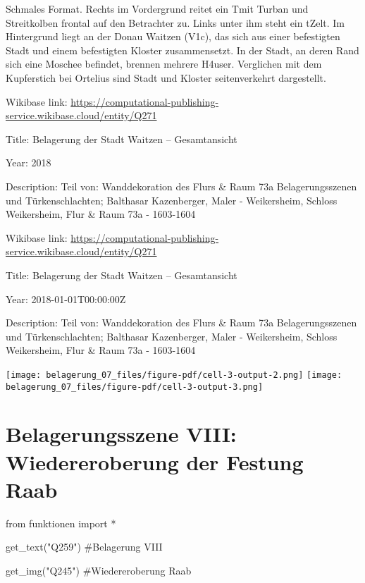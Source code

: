 \documentclass[
  a4paper,
  portrait]{book}
\newenvironment{Shaded}{\begin{snugshade}}{\end{snugshade}}
\newcommand{\CommentTok}[1]{\textcolor[rgb]{0.37,0.37,0.37}{#1}}
\newcommand{\ImportTok}[1]{\textcolor[rgb]{0.00,0.46,0.62}{#1}}
\newcommand{\NormalTok}[1]{\textcolor[rgb]{0.00,0.23,0.31}{#1}}
\newcommand{\OperatorTok}[1]{\textcolor[rgb]{0.37,0.37,0.37}{#1}}
\newcommand{\StringTok}[1]{\textcolor[rgb]{0.13,0.47,0.30}{#1}}
\begin{document}
Schmales Format. Rechts im Vordergrund reitet ein T\xbcrke mit
Turban und Streitkolben frontal auf den Betrachter zu. Links unter ihm
steht ein t\xbcrkisches Zelt. Im Hintergrund liegt an der Donau
Waitzen (V\xa1c), das sich aus einer befestigten Stadt und einem
befestigten Kloster zusammensetzt. In der Stadt, an deren Rand sich eine
Moschee befindet, brennen mehrere H\xa4user. Verglichen mit dem
Kupferstich bei Ortelius sind Stadt und Kloster seitenverkehrt
dargestellt.

Wikibase link:
\url{https://computational-publishing-service.wikibase.cloud/entity/Q271}

Title: Belagerung der Stadt Waitzen -- Gesamtansicht

Year: 2018

Description: Teil von: Wanddekoration des Flurs \& Raum 73a
Belagerungsszenen und Türkenschlachten; Balthasar Kazenberger, Maler -
Weikersheim, Schloss Weikersheim, Flur \& Raum 73a - 1603-1604

Wikibase link:
\url{https://computational-publishing-service.wikibase.cloud/entity/Q271}

Title: Belagerung der Stadt Waitzen -- Gesamtansicht

Year: 2018-01-01T00:00:00Z

Description: Teil von: Wanddekoration des Flurs \& Raum 73a
Belagerungsszenen und Türkenschlachten; Balthasar Kazenberger, Maler -
Weikersheim, Schloss Weikersheim, Flur \& Raum 73a - 1603-1604

\texttt{[image: belagerung\_07\_files/figure-pdf/cell-3-output-2.png]}
\texttt{[image: belagerung\_07\_files/figure-pdf/cell-3-output-3.png]}

\chapter{Belagerungsszene VIII: Wiedereroberung der Festung
Raab}\label{belagerungsszene-viii-wiedereroberung-der-festung-raab}

\begin{Shaded}
\begin{Highlighting}[]
\ImportTok{from}\NormalTok{ funktionen }\ImportTok{import} \OperatorTok{*}
\end{Highlighting}
\end{Shaded}

\begin{Shaded}
\begin{Highlighting}[]
\NormalTok{get\_text(}\StringTok{"Q259"}\NormalTok{)}
\CommentTok{\#Belagerung VIII}

\NormalTok{get\_img(}\StringTok{"Q245"}\NormalTok{)}
\CommentTok{\#Wiedereroberung Raab }
\end{Highlighting}
\end{Shaded}
\end{document}
